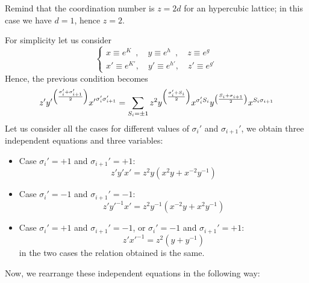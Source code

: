 \documentclass[../../Main/Main.tex]{subfiles}
\begin{document}
\begin{remark}
Remind that the coordination number is \( z=2d \) for an hypercubic lattice; in this case we have \( d=1 \), hence \( z=2 \).
\end{remark}
For simplicity let us consider
\begin{equation}
  \begin{cases}
   x \equiv e^K \,\,\,, \quad y \equiv e^h\,\,\,, \quad  z \equiv e^g \\
   x' \equiv e^{K'}, \quad  y' \equiv e^{h'}, \quad  z' \equiv e^{g'}
  \end{cases}
\end{equation}
Hence, the previous condition becomes
\begin{equation*}
  z' {y'}^{\qty(\frac{\sigma _i'+\sigma _{i+1}'}{2}) } {x'}^{\sigma _i'\sigma _{i+1}'}
  = \sum_{S_i = \pm 1}^{} z^2 y^{\qty(\frac{\sigma _i' +S_i}{2}) } x^{\sigma _i' S_i} y^{ \qty(\frac{S_i + \sigma _{i+1}}{2})} x^{S_i \sigma _{i+1}}
\end{equation*}
Let us consider all the cases for different values of \( \sigma _i' \) and \( \sigma _{i+1}' \), we obtain three independent equations and three variables:
\begin{itemize}
\item Case \( \sigma _i'=+1 \) and \( \sigma _{i+1}'=+1 \):
\begin{equation}
  z'y'x' = z^2 y (x^2y+x^{-2}y^{-1})
  \label{eq:20_7}
\end{equation}

\item Case \( \sigma _i'=-1 \) and \( \sigma _{i+1}'=-1 \):
\begin{equation}
  z'{y'}^{-1}x' = z^2 y^{-1} (x^{-2} y+x^{2}y^{-1})
  \label{eq:20_8}
\end{equation}

\item Case \( \sigma _i'=+1 \) and \( \sigma _{i+1}'=-1 \), or \( \sigma _i'=-1 \) and \( \sigma _{i+1}'=+1 \):
\begin{equation}
  z'{x'}^{-1} = z^2 (y+y^{-1})
  \label{eq:20_9}
\end{equation}
in the two cases the relation obtained is the same.
\end{itemize}
Now, we rearrange these independent equations in the following way:
\end{document}
